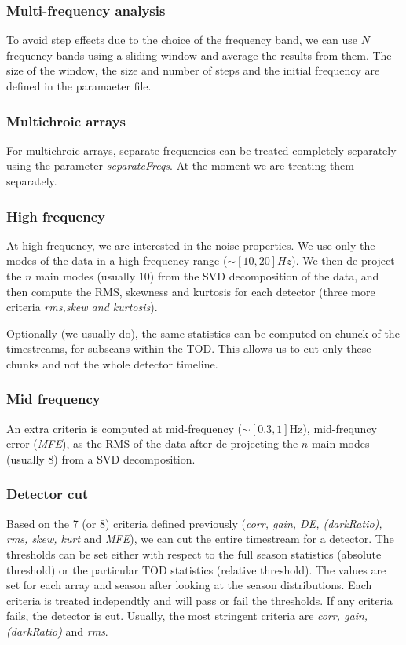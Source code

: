 \documentclass[a4paper, 11pt]{article}
\begin{document}
\subsubsection*{Multi-frequency analysis}
To avoid step effects due to the choice of the frequency band, we can use $N$ frequency bands using a sliding window and average the results from them. The size of the window, the size and number of steps and the initial frequency are defined in the paramaeter file.

\subsubsection*{Multichroic arrays}
For multichroic arrays, separate frequencies can be treated completely separately using the parameter \emph{separateFreqs}. At the moment we are treating them separately.



\subsubsection{High frequency}
At high frequency, we are interested in the noise properties. We use only the modes of the data in a high frequency range ($\sim [10,20]Hz$). We then de-project the $n$ main modes (usually 10) from the SVD decomposition of the data, and then compute the RMS, skewness and kurtosis for each detector (three more criteria \emph{rms,skew and kurtosis}).

Optionally (we usually do), the same statistics can be computed on chunck of the timestreams, for subscans within the TOD. This allows us to cut only these chunks and not the whole detector timeline.


\subsubsection{Mid frequency}
An extra criteria is computed at mid-frequency ($\sim[0.3,1]$Hz), mid-frequncy error (\emph{MFE}), as the RMS of the data after de-projecting the $n$ main modes (usually 8) from a SVD decomposition.

\subsubsection{Detector cut}
Based on the 7 (or 8) criteria defined previously (\emph{corr, gain, DE, (darkRatio), rms, skew, kurt} and \emph{MFE}), we can cut the entire timestream for a detector. The thresholds can be set either with respect to the full season statistics (absolute threshold) or the particular TOD statistics (relative threshold). The values are set for each array and season after looking at the season distributions. Each criteria is treated independtly and will pass or fail the thresholds. If any criteria fails, the detector is cut. Usually, the most stringent criteria are \emph{corr, gain, (darkRatio)} and \emph{rms}.
\end{document}
